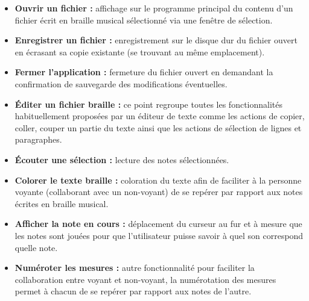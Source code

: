 \begin{itemize}
  \item \textbf{Ouvrir un fichier :} affichage sur le programme principal du contenu d'un fichier écrit en braille musical sélectionné via une fenêtre de sélection.\\
  \item \textbf{Enregistrer un fichier :} enregistrement sur le disque dur du fichier ouvert en écrasant sa copie existante (se trouvant au même emplacement).\\
  \item \textbf{Fermer l'application :} fermeture du fichier ouvert en demandant la confirmation de sauvegarde des modifications éventuelles.\\
  \item \textbf{Éditer un fichier braille :} ce point regroupe toutes les fonctionnalités habituellement proposées par un éditeur de texte comme les actions de copier, coller, couper un partie du texte ainsi que les actions de sélection de lignes et paragraphes.\\
  \item \textbf{Écouter une sélection :} lecture des notes sélectionnées.\\
  \item \textbf{Colorer le texte braille :} coloration du texte afin de faciliter à la personne voyante (collaborant avec un non-voyant) de se repérer par rapport aux notes écrites en braille musical.\\
  \item \textbf{Afficher la note en cours :} déplacement du curseur au fur et à mesure que les notes sont jouées pour que l'utilisateur puisse savoir à quel son correspond quelle note.\\
  \item \textbf{Numéroter les mesures :} autre fonctionnalité pour faciliter la collaboration entre voyant et non-voyant, la numérotation des mesures permet à chacun de se repérer par rapport aux notes de l'autre.\\
\end{itemize}

